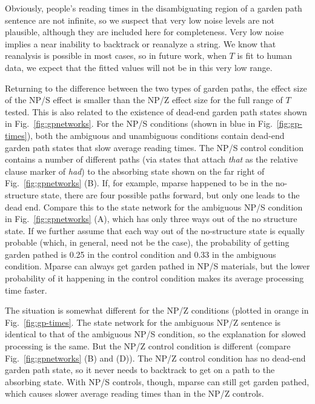 \documentclass[a4paper, 12pt]{article}
\begin{document}
Obviously, people's reading times in the disambiguating region of a garden path
sentence are not infinite, so we suspect that very low noise levels are not
plausible, although they are included here for completeness. Very low noise
implies a near inability to backtrack or reanalyze a string. We know that
reanalysis is possible in most cases, so in future work, when $T$ is fit to
human data, we expect that the fitted values will not be in this very low
range.

Returning to the difference between the two types of garden paths, the effect
size of the NP/S effect is smaller than the NP/Z effect size for the full range
of $T$ tested. This is also related to the existence of dead-end garden path
states shown in Fig.~\ref{fig:gpnetworks}. For the NP/S conditions (shown in
blue in Fig.~\ref{fig:gp-times}), both the ambiguous and unambiguous conditions
contain dead-end garden path states that slow average reading times.
The NP/S control condition contains a number of different paths (via states
that attach \emph{that} as the relative clause marker of \emph{had}) to the absorbing
state shown on the far right of Fig.~\ref{fig:gpnetworks} (B). If, for example,
mparse happened to be in the no-structure state, there are four possible paths
forward, but only one leads to the dead end. Compare this to the state network
for the ambiguous NP/S condition in Fig.~\ref{fig:gpnetworks} (A), which has only
three ways out of the no structure state. If we further assume that each way
out of the no-structure state is equally probable (which, in general, need not
be the case), the probability of getting garden pathed is 0.25 in the control
condition and 0.33 in the ambiguous condition. Mparse can always get garden
pathed in NP/S materials, but the lower probability of it happening in the
control condition makes its average processing time faster.

The situation is somewhat different for the NP/Z conditions (plotted in orange
in Fig.~\ref{fig:gp-times}. The state network for the ambiguous NP/Z sentence
is identical to that of the ambiguous NP/S condition, so the explanation for
slowed processing is the same. But the NP/Z control condition is different
(compare Fig.~\ref{fig:gpnetworks} (B) and (D)). The NP/Z control condition has
no dead-end garden path state, so it never needs to backtrack to get on a path
to the absorbing state. With NP/S controls, though, mparse can still get
garden pathed, which causes slower average reading times than in the NP/Z
controls. 
\end{document}
